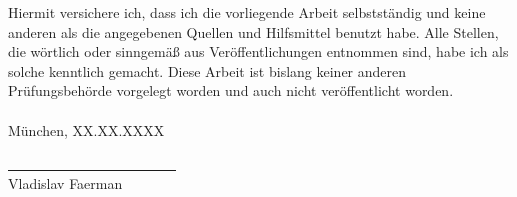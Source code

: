 
Hiermit versichere ich, dass ich die vorliegende Arbeit selbstständig und keine anderen als die angegebenen Quellen und Hilfsmittel benutzt habe. Alle Stellen, die wörtlich oder sinngemäß aus Veröffentlichungen entnommen sind, habe ich als solche kenntlich gemacht. Diese Arbeit ist bislang keiner anderen Prüfungsbehörde vorgelegt worden und auch nicht veröffentlicht worden.
\\\\München, XX.XX.XXXX

\vskip 1.5cm

\underline{~~~~~~~~~~~~~~~~~~~~~~~~}\\
Vladislav Faerman\\